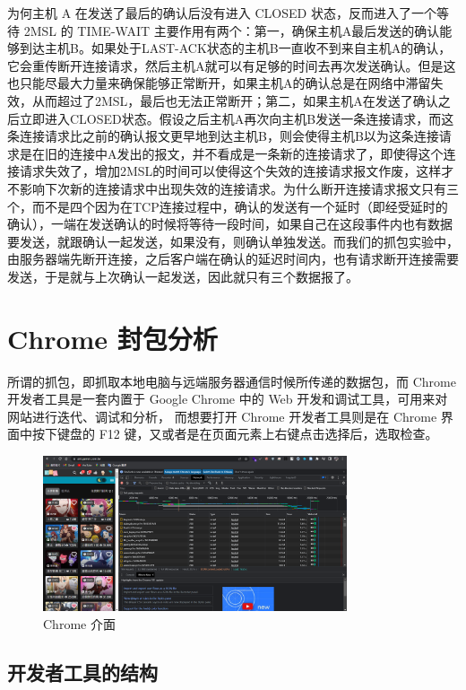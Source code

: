 为何主机 A 在发送了最后的确认后没有进入 CLOSED 状态，反而进入了一个等待 2MSL 的 TIME-WAIT 主要作用有两个：第一，确保主机A最后发送的确认能够到达主机B。如果处于LAST-ACK状态的主机B一直收不到来自主机A的确认，它会重传断开连接请求，然后主机A就可以有足够的时间去再次发送确认。但是这也只能尽最大力量来确保能够正常断开，如果主机A的确认总是在网络中滞留失效，从而超过了2MSL，最后也无法正常断开；第二，如果主机A在发送了确认之后立即进入CLOSED状态。假设之后主机A再次向主机B发送一条连接请求，而这条连接请求比之前的确认报文更早地到达主机B，则会使得主机B以为这条连接请求是在旧的连接中A发出的报文，并不看成是一条新的连接请求了，即使得这个连接请求失效了，增加2MSL的时间可以使得这个失效的连接请求报文作废，这样才不影响下次新的连接请求中出现失效的连接请求。为什么断开连接请求报文只有三个，而不是四个因为在TCP连接过程中，确认的发送有一个延时（即经受延时的确认），一端在发送确认的时候将等待一段时间，如果自己在这段事件内也有数据要发送，就跟确认一起发送，如果没有，则确认单独发送。而我们的抓包实验中，由服务器端先断开连接，之后客户端在确认的延迟时间内，也有请求断开连接需要发送，于是就与上次确认一起发送，因此就只有三个数据报了。

\section{Chrome 封包分析}

所谓的抓包，即抓取本地电脑与远端服务器通信时候所传递的数据包，而 Chrome 开发者工具是一套内置于 Google Chrome 中的 Web 开发和调试工具，可用来对网站进行迭代、调试和分析，
而想要打开 Chrome 开发者工具则是在 Chrome 界面中按下键盘的 F12 键，又或者是在页面元素上右键点击选择后，选取检查。

\begin{figure}[htb]
\centering 
\includegraphics[width=0.80\textwidth]{img/newch1m5.png} 
\caption{Chrome 介面}
\label{Test}
\end{figure}

\subsection{开发者工具的结构}

